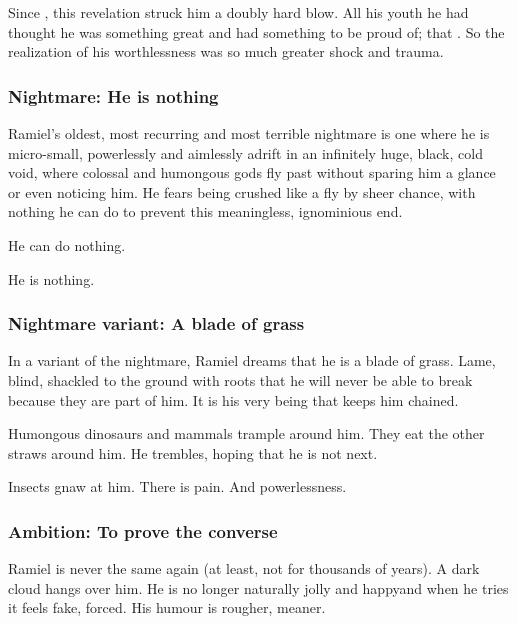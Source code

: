 Since , this revelation struck him a doubly hard blow. 
All his youth he had thought he was something great and had something to be proud of; that . 
So the realization of his worthlessness was so much greater shock and trauma. 




\subsubsection{Nightmare: He is nothing}
Ramiel's oldest, most recurring and most terrible nightmare is one where he is micro-small, powerlessly and aimlessly adrift in an infinitely huge, black, cold void, where colossal and humongous gods fly past without sparing him a glance or even noticing him. 
He fears being crushed like a fly by sheer chance, with nothing he can do to prevent this meaningless, ignominious end. 

He can do nothing. 

He is nothing. 




\subsubsection{Nightmare variant: A blade of grass}
In a variant of the  nightmare, Ramiel dreams that he is a blade of grass. 
Lame, blind, shackled to the ground with roots that he will never be able to break because they are part of him. 
It is his very being that keeps him chained. 

Humongous dinosaurs and mammals trample around him. 
They eat the other straws around him. 
He trembles, hoping that he is not next. 

Insects gnaw at him. 
There is pain. 
And powerlessness. 






\subsubsection{Ambition: To prove the converse}
Ramiel is never the same again (at least, not for thousands of years). 
A dark cloud hangs over him. 
He is no longer naturally jolly and happy\dash and when he tries it feels fake, forced. 
His humour is rougher, meaner. 

